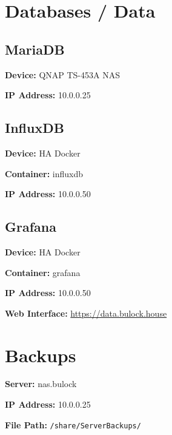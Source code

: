 \documentclass[]{article}
\begin{document}
 \newpage

 \vspace{\baselineskip}\section*{Databases / Data}

\subsection{\texorpdfstring{{MariaDB}}{MariaDB}}

\textbf{Device: }
{QNAP TS-453A NAS}

\textbf{IP Address: }
{10.0.0.25}

\subsection{\texorpdfstring{{InfluxDB}}{InfluxDB}}

\textbf{Device: }
{HA Docker}

\textbf{Container: }
{influxdb}

\textbf{IP Address: }
{10.0.0.50}

\subsection{\texorpdfstring{{Grafana}}{Grafana}}

\textbf{Device: }
{HA Docker}

\textbf{Container: }
{grafana}

\textbf{IP Address: }
{10.0.0.50}

\textbf{Web Interface: }
{\href{https://www.google.com/url?q=https://data.bulock.house\&sa=D\&ust=1544293199854000}{https://data.bulock.house}}



\newpage

\vspace{\baselineskip}\section*{Backups}

\textbf{Server: }
{nas.bulock}

\textbf{IP Address: }
{10.0.0.25}

\textbf{File Path: }
\texttt{/share/ServerBackups/}
\end{document}
